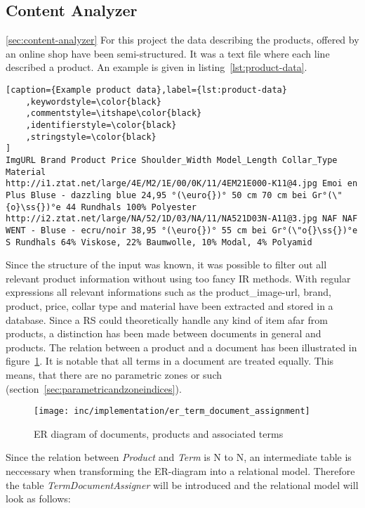 
\subsection{Content Analyzer}
\ref{sec:content-analyzer}
For this project the data describing the products, offered by an online shop have been semi-structured.
It was a text file where each line described a product.
An example is given in listing~\ref{lst:product-data}.

\begin{lstlisting}[caption={Example product data},label={lst:product-data}
    ,keywordstyle=\color{black}
    ,commentstyle=\itshape\color{black}
    ,identifierstyle=\color{black}
    ,stringstyle=\color{black}
]
ImgURL Brand Product Price Shoulder_Width Model_Length Collar_Type Material
http://i1.ztat.net/large/4E/M2/1E/00/0K/11/4EM21E000-K11@4.jpg Emoi en Plus Bluse - dazzling blue 24,95 °(\euro{})° 50 cm 70 cm bei Gr°(\"{o}\ss{})°e 44 Rundhals 100% Polyester
http://i2.ztat.net/large/NA/52/1D/03/NA/11/NA521D03N-A11@3.jpg NAF NAF WENT - Bluse - ecru/noir 38,95 °(\euro{})° 55 cm bei Gr°(\"o{}\ss{})°e S Rundhals 64% Viskose, 22% Baumwolle, 10% Modal, 4% Polyamid
\end{lstlisting}

\noindent
Since the structure of the input was known, it was possible to filter out all relevant product information without using too fancy IR methods.
With regular expressions all relevant informations such as the product\_image-url, brand, product, price, collar type and material have been extracted and stored in a database.
Since a RS could theoretically handle any kind of item afar from products, a distinction has been made between documents in general and products.
The relation between a product and a document has been illustrated in figure~\ref{fig:ertermdocumentassignment}.
It is notable that all terms in a document are treated equally.
This means, that there are no parametric zones or such (section~\ref{sec:parametricandzoneindices}).
\begin{figure}[h]
    \center
    \texttt{[image: inc/implementation/er\_term\_document\_assignment]}
    \caption{ER diagram of documents, products and associated terms}
    \label{fig:ertermdocumentassignment}
\end{figure}
Since the relation between \textit{Product} and \textit{Term} is N to N, an intermediate table is neccessary when transforming the ER-diagram into a relational model.
Therefore the table \textit{TermDocumentAssigner} will be introduced and the relational model will look as follows:

